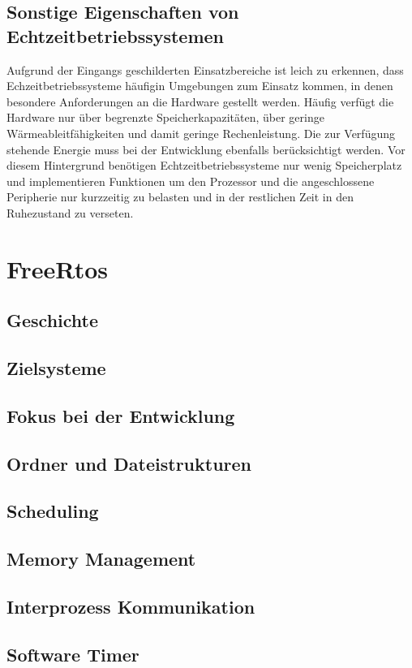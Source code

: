 \documentclass[ngerman]{seminarvorlage}
\begin{document}
\subsection{Sonstige Eigenschaften von Echtzeitbetriebssystemen}
Aufgrund der Eingangs geschilderten Einsatzbereiche ist leich zu erkennen, dass Echzeitbetriebssysteme häufigin Umgebungen zum Einsatz kommen, in denen besondere Anforderungen an die Hardware gestellt werden. Häufig verfügt die Hardware nur über begrenzte Speicherkapazitäten, über geringe Wärmeableitfähigkeiten und damit geringe Rechenleistung. Die zur Verfügung stehende Energie muss bei der Entwicklung ebenfalls berücksichtigt werden. 
Vor diesem Hintergrund benötigen Echtzeitbetriebssysteme nur wenig Speicherplatz und implementieren Funktionen um den Prozessor und die angeschlossene Peripherie nur kurzzeitig zu belasten und in der restlichen Zeit in den Ruhezustand zu verseten.

\section{FreeRtos} 
\subsection{Geschichte}
\subsection{Zielsysteme}
\subsection{Fokus bei der Entwicklung}
\subsection{Ordner und Dateistrukturen} 
\subsection{Scheduling}
\subsection{Memory Management}
\subsection{Interprozess Kommunikation}
\subsection{Software Timer}
\end{document}
